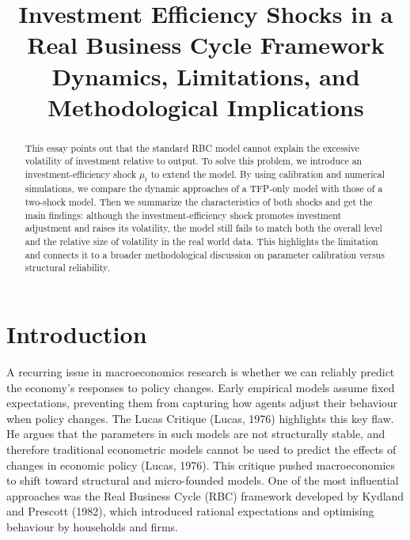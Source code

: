 \documentclass[12pt]{article}
\title{%
\textbf{Investment Efficiency Shocks in a Real Business Cycle Framework} \\
\vspace{0.5em}
\large Dynamics, Limitations, and Methodological Implications
}
\date{}
\begin{document}
\maketitle
% 

\begin{abstract}
   This essay points out that the standard RBC model cannot explain the excessive volatility of investment relative to output. To solve this problem, we introduce an investment-efficiency shock $\mu_t$ to extend the model. By using calibration and numerical simulations, we compare the dynamic approaches of a TFP-only model with those of a two-shock model. Then we summarize the characteristics of both shocks and get the main findings: although the investment-efficiency shock promotes investment adjustment and raises its volatility, the model still fails to match both the overall level and the relative size of volatility in the real world data. This highlights the limitation and connects it to a broader methodological discussion on parameter calibration versus structural reliability. 
\end{abstract}



\section{Introduction}
A recurring issue in macroeconomics research is whether we can reliably predict the economy’s responses to policy changes. Early empirical models assume fixed expectations, preventing them from capturing how agents adjust their behaviour when policy changes. The Lucas Critique (Lucas, 1976) highlights this key flaw. He argues that the parameters in such models are not structurally stable, and therefore traditional econometric models cannot be used to predict the effects of changes in economic policy (Lucas, 1976). This critique pushed macroeconomics to shift toward structural and micro-founded models. One of the most influential approaches was the Real Business Cycle (RBC) framework developed by  Kydland and Prescott (1982), which introduced rational expectations and optimising behaviour by households and firms.
\end{document}
